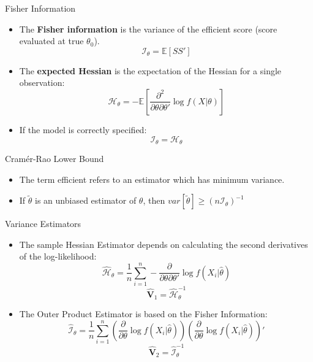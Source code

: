 \documentclass[aspectratio=169, handout, t]{beamer}
\numberwithin{equation}{section}
\begin{document}
\begin{frame}{Fisher Information}

\begin{itemize}
\item The \textbf{Fisher information} is the variance of the efficient score (score evaluated at true $\theta_0$).
$$\mathcal{I}_\theta=\mathbb{E}[SS']$$\pause
\item The \textbf{expected Hessian} is the expectation of the Hessian for a single observation:
$$\mathcal{H}_\theta=-\mathbb{E}[\frac{\partial^2}{\partial \theta \partial \theta'}\log f(X|\theta)]$$\pause
\item If the model is correctly specified:
$$\mathcal{I}_\theta=\mathcal{H}_\theta$$
\end{itemize}
\end{frame}


\begin{frame}{Cram\'{e}r-Rao Lower Bound}

\begin{itemize}
\item The term efficient refers to an estimator which has minimum variance.
\item If $\tilde{\theta}$ is an unbiased estimator of $\theta$, then $var[\tilde{\theta}]\geq (n\mathcal{I}_\theta)^{-1}$
\end{itemize}
\end{frame}



\begin{frame}{Variance Estimators}

\begin{itemize}
\item The sample Hessian Estimator depends on calculating the second derivatives of the log-likelihood:
$$\hat{\mathcal{H}}_\theta=\frac{1}{n}\sum_{i=1}^n - \frac{\partial}{\partial \theta\partial \theta'} \log f(X_i|\hat{\theta})$$
$$\hat{\mathbf{V}}_1=\hat{\mathcal{H}}_\theta^{-1}$$\pause
 \item The Outer Product Estimator is based on the Fisher Information:
 $$\hat{\mathcal{I}}_\theta=\frac{1}{n}\sum_{i=1}^n(\frac{\partial}{\partial \theta} \log f(X_i|\hat{\theta}))(\frac{\partial}{\partial \theta} \log f(X_i|\hat{\theta}))'$$
$$\hat{\mathbf{V}}_2=\hat{\mathcal{I}}_\theta^{-1}$$

 \end{itemize}
\end{frame}
\end{document}
